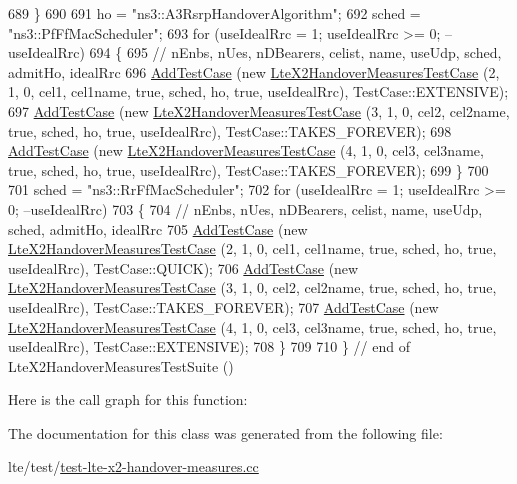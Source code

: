 \begin{DoxyCode}
689     \}
690 
691   ho = \textcolor{stringliteral}{"ns3::A3RsrpHandoverAlgorithm"};
692   sched = \textcolor{stringliteral}{"ns3::PfFfMacScheduler"};
693   \textcolor{keywordflow}{for} (useIdealRrc = 1; useIdealRrc >= 0; --useIdealRrc)
694     \{
695       \textcolor{comment}{//                                          nEnbs, nUes, nDBearers, celist, name, useUdp, sched,
       admitHo, idealRrc}
696       \hyperlink{classns3_1_1TestCase_a3718088e3eefd5d6454569d2e0ddd835}{AddTestCase} (\textcolor{keyword}{new} \hyperlink{classLteX2HandoverMeasuresTestCase}{LteX2HandoverMeasuresTestCase} (2,   1,    0,
          cel1, cel1name, \textcolor{keyword}{true}, sched, ho, \textcolor{keyword}{true}, useIdealRrc), TestCase::EXTENSIVE);
697       \hyperlink{classns3_1_1TestCase_a3718088e3eefd5d6454569d2e0ddd835}{AddTestCase} (\textcolor{keyword}{new} \hyperlink{classLteX2HandoverMeasuresTestCase}{LteX2HandoverMeasuresTestCase} (3,   1,    0,
          cel2, cel2name, \textcolor{keyword}{true}, sched, ho, \textcolor{keyword}{true}, useIdealRrc), TestCase::TAKES\_FOREVER);
698       \hyperlink{classns3_1_1TestCase_a3718088e3eefd5d6454569d2e0ddd835}{AddTestCase} (\textcolor{keyword}{new} \hyperlink{classLteX2HandoverMeasuresTestCase}{LteX2HandoverMeasuresTestCase} (4,   1,    0,
          cel3, cel3name, \textcolor{keyword}{true}, sched, ho, \textcolor{keyword}{true}, useIdealRrc), TestCase::TAKES\_FOREVER);
699     \}
700 
701   sched = \textcolor{stringliteral}{"ns3::RrFfMacScheduler"};
702   \textcolor{keywordflow}{for} (useIdealRrc = 1; useIdealRrc >= 0; --useIdealRrc)
703     \{
704       \textcolor{comment}{//                                          nEnbs, nUes, nDBearers, celist, name, useUdp, sched,
       admitHo, idealRrc}
705       \hyperlink{classns3_1_1TestCase_a3718088e3eefd5d6454569d2e0ddd835}{AddTestCase} (\textcolor{keyword}{new} \hyperlink{classLteX2HandoverMeasuresTestCase}{LteX2HandoverMeasuresTestCase} (2,   1,    0,
          cel1, cel1name, \textcolor{keyword}{true}, sched, ho, \textcolor{keyword}{true}, useIdealRrc), TestCase::QUICK);
706       \hyperlink{classns3_1_1TestCase_a3718088e3eefd5d6454569d2e0ddd835}{AddTestCase} (\textcolor{keyword}{new} \hyperlink{classLteX2HandoverMeasuresTestCase}{LteX2HandoverMeasuresTestCase} (3,   1,    0,
          cel2, cel2name, \textcolor{keyword}{true}, sched, ho, \textcolor{keyword}{true}, useIdealRrc), TestCase::TAKES\_FOREVER);
707       \hyperlink{classns3_1_1TestCase_a3718088e3eefd5d6454569d2e0ddd835}{AddTestCase} (\textcolor{keyword}{new} \hyperlink{classLteX2HandoverMeasuresTestCase}{LteX2HandoverMeasuresTestCase} (4,   1,    0,
          cel3, cel3name, \textcolor{keyword}{true}, sched, ho, \textcolor{keyword}{true}, useIdealRrc), TestCase::EXTENSIVE);
708     \}
709 
710 \} \textcolor{comment}{// end of LteX2HandoverMeasuresTestSuite ()}
\end{DoxyCode}


Here is the call graph for this function\+:




The documentation for this class was generated from the following file\+:\begin{DoxyCompactItemize}
\item 
lte/test/\hyperlink{test-lte-x2-handover-measures_8cc}{test-\/lte-\/x2-\/handover-\/measures.\+cc}\end{DoxyCompactItemize}
